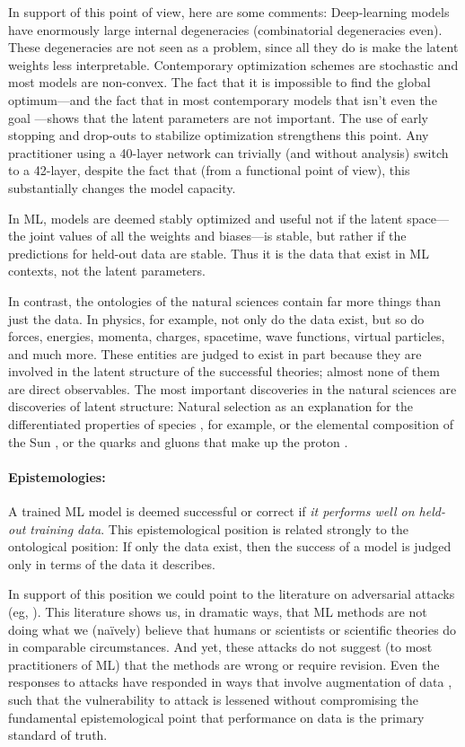 \documentclass[10pt]{article}
\begin{document}
In support of this point of view, here are some comments:
Deep-learning models have enormously large internal degeneracies (combinatorial degeneracies even).
These degeneracies are not seen as a problem, since all they do is make the latent weights less interpretable.
Contemporary optimization schemes are stochastic \cite{stochastic} and most models are non-convex.
The fact that it is impossible to find the global optimum---and the fact that in most contemporary models that isn't even the goal \cite{not_global}---shows that the latent parameters are not important.
The use of early stopping \cite{early_stop} and drop-outs \cite{dropout} to stabilize optimization strengthens this point.
Any practitioner using a 40-layer network can trivially (and without analysis) switch to a 42-layer, despite the fact that (from a functional point of view), this substantially changes the model capacity.

In ML, models are deemed stably optimized and useful not if the latent space---the joint values of all the weights and biases---is stable, but rather if the predictions for held-out data are stable.
Thus it is the data that exist in ML contexts, not the latent parameters.

In contrast, the ontologies of the natural sciences contain far more things than just the data.
In physics, for example, 
not only do the data exist, but so do forces, energies, momenta, charges, spacetime, wave functions, virtual particles, and much more.
These entities are judged to exist in part because they are involved in the latent structure of the successful theories; almost none of them are direct observables.
The most important discoveries in the natural sciences are discoveries of latent structure: Natural selection as an explanation for the differentiated properties of species \cite{natural_selection}, for example, or the elemental composition of the Sun \cite{sun_composition}, or the quarks and gluons that make up the proton \cite{proton_substructure}.

\paragraph{Epistemologies:}
A trained ML model is deemed successful or correct if \emph{it performs well on held-out training data}.
This epistemological position is related strongly to the ontological position:
If only the data exist, then the success of a model is judged only in terms of the data it describes.

In support of this position we could point to the literature on adversarial attacks (eg, \cite{adversarial1}).
This literature shows us, in dramatic ways, that ML methods are not doing what we (na\"ively) believe that humans or scientists or scientific theories do in comparable circumstances.
And yet, these attacks do not suggest (to most practitioners of ML) that the methods are wrong or require revision.
Even the responses to attacks have responded in ways that involve augmentation of data \cite{adversarial_training}, such that the vulnerability to attack is lessened without compromising the fundamental epistemological point that performance on data is the primary standard of truth.
\end{document}
